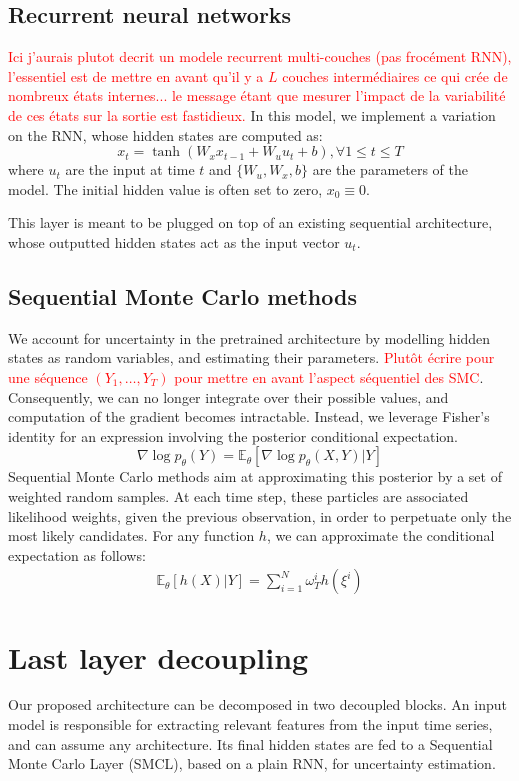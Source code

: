 \documentclass{article}
\begin{document}
\subsection{Recurrent neural networks}
\label{sec:background:rnn}
\textcolor{red}{Ici j'aurais plutot decrit un modele recurrent multi-couches (pas frocément RNN), l'essentiel est de mettre en avant qu'il y a $L$ couches intermédiaires ce qui crée de nombreux états internes... le message étant que mesurer l'impact de la variabilité de ces états sur la sortie est fastidieux.}
In this model, we implement a variation on the RNN, whose hidden states are computed as:
$$
	x_t = \tanh(W_x x_{t-1} + W_u u_t + b), \forall 1 \leq t \leq T
$$
where $u_t$ are the input at time $t$ and $\{W_u, W_x, b\}$ are the parameters of the model. The initial hidden value is often set to zero, $x_0 \equiv 0$.

This layer is meant to be plugged on top of an existing sequential architecture, whose outputted hidden states act as the input vector $u_t$.

\subsection{Sequential Monte Carlo methods}
\label{sec:background:smc}

We account for uncertainty in the pretrained architecture by modelling hidden states as random variables, and estimating their parameters. \textcolor{red}{Plut\^ot écrire pour une séquence $(Y_1,\ldots,Y_T)$ pour mettre en avant l'aspect séquentiel des SMC}.
Consequently, we can no longer integrate over their possible values, and computation of the gradient becomes intractable.
Instead, we leverage Fisher's identity for an expression involving the posterior conditional expectation.
$$
	\nabla \log p_\theta(Y) = \mathbb{E}_\theta \left[ \nabla\log p_\theta(X, Y) | Y \right]
$$
Sequential Monte Carlo methods aim at approximating this posterior by a set of weighted random samples.
At each time step, these particles are associated likelihood weights, given the previous observation, in order to perpetuate only the most likely candidates.
For any function $h$, we can approximate the conditional expectation as follows:
\begin{align*}
	\mathbb{E}_\theta \left[ h(X) | Y \right] = \sum_{i=1}^N \omega_T^i h(\xi^i)
\end{align*}

\section{Last layer decoupling}
\label{sec:decoupling}
Our proposed architecture can be decomposed in two decoupled blocks.
An input model is responsible for extracting relevant features from the input time series, and can assume any architecture.
Its final hidden states are fed to a Sequential Monte Carlo Layer (SMCL), based on a plain RNN, for uncertainty estimation.
\end{document}
